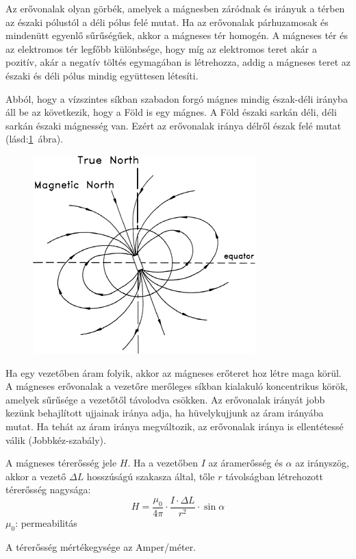 Az erővonalak olyan görbék, amelyek a mágnesben záródnak és irányuk a térben az északi pólustól a déli pólus felé mutat. Ha az erővonalak párhuzamosak és mindenütt egyenlő sűrűségűek, akkor a mágneses tér homogén. A mágneses tér és az elektromos tér legfőbb különbsége, hogy míg az elektromos teret akár a pozitív, akár a negatív töltés egymagában is létrehozza, addig a mágneses teret az északi és déli pólus mindig együttesen létesíti.

Abból, hogy a vízszintes síkban szabadon forgó mágnes mindig észak-déli irányba áll be az következik, hogy a Föld is egy mágnes. A Föld északi sarkán déli, déli sarkán északi mágnesség van. Ezért az erővonalak iránya délről észak felé mutat (lásd:\ref{fig:9-eathmagneticfield}~ábra).
\begin{figure}[h]
	\centering
	\includegraphics[width=0.3\linewidth]{fig/9-Eath_magnetic_field}
	\caption{}
	\label{fig:9-eathmagneticfield}
\end{figure}

Ha egy vezetőben áram folyik, akkor az mágneses erőteret hoz létre maga körül. A mágneses erővonalak a vezetőre merőleges síkban kialakuló koncentrikus körök, amelyek sűrűsége a vezetőtől távolodva csökken. Az erővonalak irányát jobb kezünk behajlított ujjainak iránya adja, ha hüvelykujjunk az áram irányába mutat. Ha tehát az áram iránya megváltozik, az erővonalak iránya is ellentétessé válik (Jobbkéz-szabály).
\begin{theorem}
A mágneses térerősség jele $H$. Ha a vezetőben $I$ az áramerősség és $\alpha$ az irányszög, akkor a vezető $\Delta L$ hosszúságú szakasza által, tőle $r$ távolságban létrehozott térerősség nagysága:
$$H=\frac{\mu_0}{4\pi}\cdot\frac{I\cdot \Delta L}{r^2}\cdot \sin \alpha$$
$\mu_0$: permeabilitás
\end{theorem}
A térerősség mértékegysége az Amper/méter.

